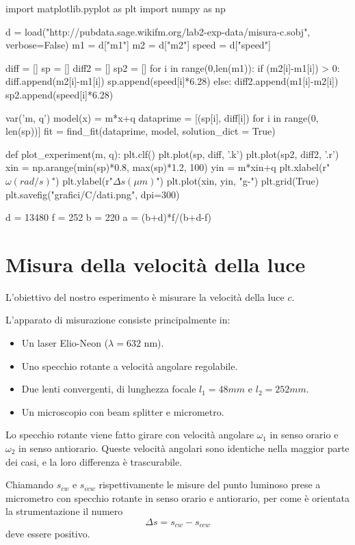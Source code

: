 \begin{sagesilent}
import matplotlib.pyplot as plt
import numpy as np

d = load("http://pubdata.sage.wikifm.org/lab2-exp-data/misura-c.sobj", verbose=False)
m1 = d["m1"]
m2 = d["m2"]
speed = d["speed"]

diff = []
sp = []
diff2 = []
sp2 = []
for i in range(0,len(m1)):
    if (m2[i]-m1[i]) > 0:
        diff.append(m2[i]-m1[i])
        sp.append(speed[i]*6.28)
    else:
        diff2.append(m1[i]-m2[i])
        sp2.append(speed[i]*6.28)

var('m, q')
model(x) = m*x+q
dataprime = [(sp[i], diff[i]) for i in range(0, len(sp))]
fit = find_fit(dataprime, model, solution_dict = True)

def plot_experiment(m, q):
    plt.clf()
    plt.plot(sp, diff, '.k')
    plt.plot(sp2, diff2, '.r')
    xin = np.arange(min(sp)*0.8, max(sp)*1.2, 100)
    yin = m*xin+q
    plt.xlabel(r"$\omega (rad/s)$")
    plt.ylabel(r"$\Delta s (\mu m)$")
    plt.plot(xin, yin, "g-")
    plt.grid(True)
    plt.savefig("grafici/C/dati.png", dpi=300)
    
d = 13480
f = 252
b = 220
a = (b+d)*f/(b+d-f)
\end{sagesilent}


\chapter{Misura della velocità della luce}

L'obiettivo del nostro esperimento è misurare la velocità della luce $c$.

L'apparato di misurazione consiste principalmente in:
\begin{itemize}
 \item Un laser Elio-Neon ($\lambda=632$ nm).
 \item Uno specchio rotante a velocità angolare regolabile.
 \item Due lenti convergenti, di lunghezza focale $l_1 = 48mm$ e $l_2 = 252 mm$.
 \item Un microscopio con beam splitter e micrometro.
\end{itemize}

Lo specchio rotante viene fatto girare con velocità angolare $\omega_1$ in senso orario e $\omega_2$ in senso antiorario. Queste velocità angolari sono identiche nella maggior parte dei casi, e la loro differenza è trascurabile.

Chiamando $s_{cw}$ e $s_{ccw}$ rispettivamente le misure del punto luminoso prese a micrometro con specchio rotante in senso orario e antiorario, per come è orientata la strumentazione il numero
$$\Delta s = s_{cw} - s_{ccw}$$
deve essere positivo.

